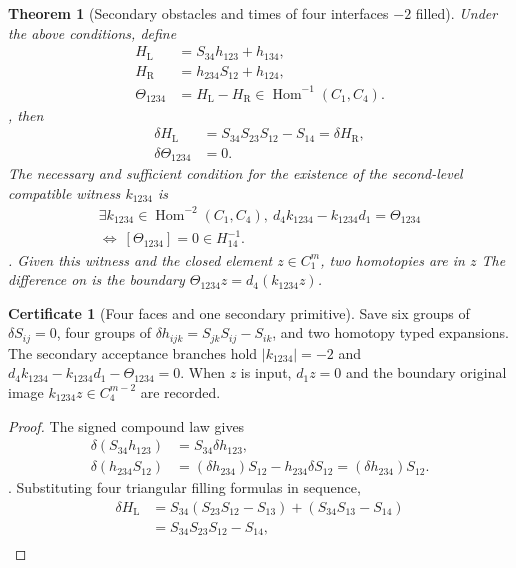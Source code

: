 \documentclass[12pt,a4paper,openany,notitlepage]{report}
\theoremstyle{plain}
\newtheorem{theorem}{Theorem}[chapter]
\theoremstyle{definition}
\newtheorem*{certificate}{Certificate}
\theoremstyle{remark}
\begin{document}
\begin{CJK*}
\begin{theorem}
[Secondary obstacles and times of four interfaces $-2$ filled]\label{exp:hom:secondary-obstruction}
Under the above conditions, define \[
 \begin{aligned}
 H_{\mathrm L}&=S_{34}h_{123}+h_{134},\\
 H_{\mathrm R}&=h_{234}S_{12}+h_{124},\\
 \Theta_{1234}
 &=H_{\mathrm L}-H_{\mathrm R}
 \in\operatorname{Hom}^{-1}(C_1,C_4).
 \end{aligned}
\], then \[
 \begin{aligned}
 \delta H_{\mathrm L}
 &=S_{34}S_{23}S_{12}-S_{14}
 =\delta H_{\mathrm R},\\
 \delta\Theta_{1234}&=0.
 \end{aligned}
\] The necessary and sufficient condition for the existence of the second-level compatible witness $k_{1234}$ is \[
 \begin{gathered}
 \exists k_{1234}\in\operatorname{Hom}^{-2}(C_1,C_4),\
 d_4k_{1234}-k_{1234}d_1=\Theta_{1234}\\
 \Longleftrightarrow\
 [\Theta_{1234}]=0\in H^{-1}_{14}.
 \end{gathered}
\]. Given this witness and the closed element $z\in C_1^m$, two homotopies are in $z$ The difference on is the boundary $\Theta_{1234}z=d_4(k_{1234}z)$.\end{theorem}
\begin{certificate}
[Four faces and one secondary primitive]Save six groups of $\delta S_{ij}=0$, four groups of $\delta h_{ijk}=S_{jk}S_{ij}-S_{ik}$, and two homotopy typed expansions. The secondary acceptance branches hold $|k_{1234}|=-2$ and $d_4k_{1234}-k_{1234}d_1-\Theta_{1234}=0$. When $z$ is input, $d_1z=0$ and the boundary original image $k_{1234}z\in C_4^{m-2}$ are recorded.\end{certificate}
\begin{proof}
The signed compound law gives \[
 \begin{aligned}
 \delta(S_{34}h_{123})
 &=S_{34}\delta h_{123},\\
 \delta(h_{234}S_{12})
 &=(\delta h_{234})S_{12}
   -h_{234}\delta S_{12}
 =(\delta h_{234})S_{12}.
 \end{aligned}
\]. Substituting four triangular filling formulas in sequence, \[
 \begin{aligned}
 \delta H_{\mathrm L}
 &=S_{34}(S_{23}S_{12}-S_{13})
   +(S_{34}S_{13}-S_{14})\\
 &=S_{34}S_{23}S_{12}-S_{14},\\

\end{aligned}\]
\end{proof}
\end{CJK*}
\end{document}
